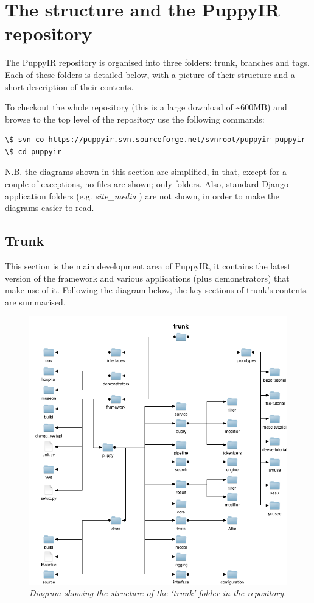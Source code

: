 \documentclass[letterpaper,10pt,english]{sphinxmanual}
\begin{document}
\section{The structure and the PuppyIR repository}
\label{repo:repo}\label{repo:the-structure-and-the-puppyir-repository}\label{repo::doc}
The PuppyIR repository is organised into three folders: trunk, branches and tags. Each of these folders is detailed below, with a picture of their structure and a short description of their contents.

To checkout the whole repository (this is a large download of \textasciitilde{}600MB) and browse to the top level of the repository use the following commands:

\begin{Verbatim}[commandchars=\\\{\}]
\$ svn co https://puppyir.svn.sourceforge.net/svnroot/puppyir puppyir
\$ cd puppyir
\end{Verbatim}

N.B. the diagrams shown in this section are simplified, in that, except for a couple of exceptions, no files are shown; only folders. Also, standard Django application folders (e.g. \emph{site\_media} ) are not shown, in order to make the diagrams easier to read.


\subsection{Trunk}
\label{repo:trunk}
This section is the main development area of PuppyIR, it contains the latest version of the framework and various applications (plus demonstrators) that make use of it. Following the diagram below, the key sections of trunk's contents are summarised.
\begin{figure}[htbp]
\centering
\capstart

\includegraphics{trunk.png}
\caption{\emph{Diagram showing the structure of the `trunk' folder in the repository.}}\end{figure}
\end{document}
